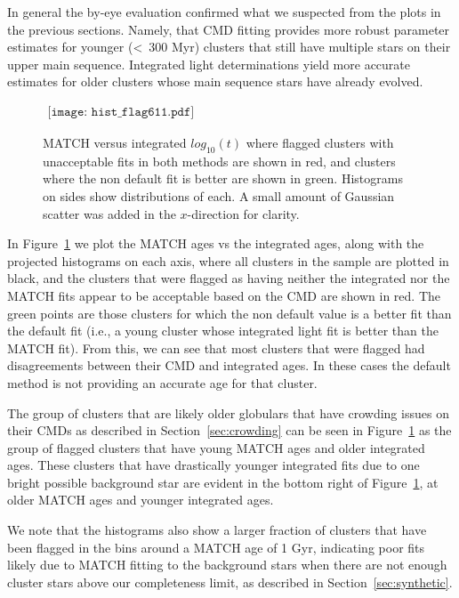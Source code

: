 \documentclass{emulateapj}
\begin{document}
In general the by-eye evaluation confirmed what we suspected from the plots in the previous sections.  Namely, that CMD fitting provides more robust parameter estimates for younger (\textless\ 300 Myr) clusters that still have multiple stars on their upper main sequence.  Integrated light determinations yield more accurate estimates for older clusters whose main sequence stars have already evolved.


\begin{figure}[ht!]
   \begin{center}$
      \begin{array}{cc}
         \texttt{[image: hist\_flag611.pdf]} 
      \end{array}$
   \end{center}
  \caption{MATCH versus integrated $log_{10} (t)$ where flagged clusters with unacceptable fits in both methods are shown in red, and clusters where the non default fit is better are shown in green. Histograms on sides show distributions of each.  A small amount of Gaussian scatter was added in the $x$-direction for clarity.}
  \label{fig:flaghist}
\end{figure}

In Figure~\ref{fig:flaghist} we plot the MATCH ages vs the integrated ages, along with the projected histograms on each axis, where all clusters in the sample are plotted in black, and the clusters that were flagged as having neither the integrated nor the MATCH fits appear to be acceptable based on the CMD are shown in red.  The green points are those clusters for which the non default value is a better fit than the default fit (i.e., a young cluster whose integrated light fit is better than the MATCH fit).  From this, we can see that most clusters that were flagged had disagreements between their CMD and integrated ages.  In these cases the default method is not providing an accurate age for that cluster.  

The group of clusters that are likely older globulars that have crowding issues on their CMDs as described in Section~\ref{sec:crowding} can be seen in Figure~\ref{fig:flaghist} as the group of flagged clusters that have young MATCH ages and older integrated ages.  These clusters that have drastically younger integrated fits due to one bright possible background star are evident in the bottom right of Figure~\ref{fig:flaghist}, at older MATCH ages and younger integrated ages. 

We note that the histograms also show a larger fraction of clusters that have been flagged in the bins around a MATCH age of 1 Gyr, indicating poor fits likely due to MATCH fitting to the background stars when there are not enough cluster stars above our completeness limit, as described in Section~\ref{sec:synthetic}.
\end{document}
